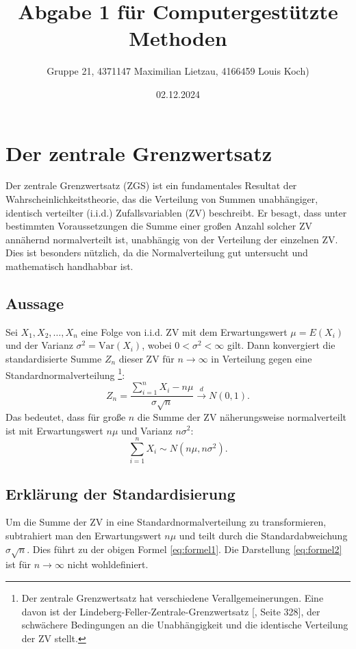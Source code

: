 \documentclass[a4paper,11pt]{article}
\title{Abgabe 1 für Computergestützte Methoden}
\author{Gruppe 21, 4371147 Maximilian Lietzau, 4166459 Louis Koch)}
\date{02.12.2024}
\begin{document}
\maketitle

\tableofcontents

\newpage

\section{Der zentrale Grenzwertsatz}
Der zentrale Grenzwertsatz (ZGS) ist ein fundamentales Resultat der Wahrscheinlichkeitstheorie, das die Verteilung von Summen unabhängiger, identisch verteilter (i.i.d.) Zufallsvariablen (ZV) beschreibt. Er besagt, dass unter bestimmten Voraussetzungen die Summe einer großen Anzahl solcher ZV annähernd normalverteilt ist, unabhängig von der Verteilung der einzelnen ZV. Dies ist besonders nützlich, da die Normalverteilung gut untersucht und mathematisch handhabbar ist.

\subsection{Aussage}
Sei \( X_1, X_2, \dots, X_n \) eine Folge von i.i.d. ZV mit dem Erwartungswert \( \mu = E(X_i) \) und der Varianz \( \sigma^2 = \text{Var}(X_i) \), wobei \( 0 < \sigma^2 < \infty \) gilt. Dann konvergiert die standardisierte Summe \( Z_n \) dieser ZV für \( n \to \infty \) in Verteilung gegen eine Standardnormalverteilung \footnote{  Der zentrale Grenzwertsatz hat verschiedene Verallgemeinerungen. Eine davon ist der
Lindeberg-Feller-Zentrale-Grenzwertsatz [\cite{Klenke2013}, Seite 328], der schwächere Bedingungen an
die Unabhängigkeit und die identische Verteilung der ZV stellt.}:
\begin{equation}
Z_n = \frac{\sum_{i=1}^{n} X_i - n \mu}{\sigma \sqrt{n}} \xrightarrow{d} N(0, 1).
\label{eq:formel1}
\end{equation}
Das bedeutet, dass für große \( n \) die Summe der ZV näherungsweise normalverteilt ist mit Erwartungswert \( n \mu \) und Varianz \( n \sigma^2 \):
\begin{equation}
\sum_{i=1}^{n} X_i \sim N(n \mu, n \sigma^2).
\label{eq:formel2}
\end{equation}

\subsection{Erklärung der Standardisierung}
Um die Summe der ZV in eine Standardnormalverteilung zu transformieren, subtrahiert man den Erwartungswert \( n \mu \) und teilt durch die Standardabweichung \( \sigma \sqrt{n} \). Dies führt zu der obigen Formel \ref{eq:formel1}. Die Darstellung \ref{eq:formel2} ist für \( n \to \infty \) nicht wohldefiniert.
\end{document}
